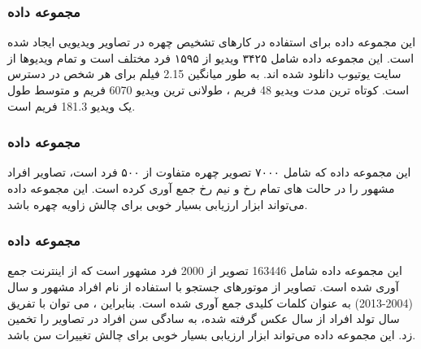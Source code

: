 \subsubsection{مجموعه داده }
این مجموعه داده برای استفاده در کارهای تشخیص چهره در تصاویر ویدیویی ایجاد شده است. این مجموعه داده شامل ۳۴۲۵ ویدیو از ۱۵۹۵ فرد مختلف است و تمام ویدیوها از سایت یوتیوب دانلود شده اند. به طور میانگین 2.15 فیلم برای هر شخص در دسترس است. کوتاه ترین مدت ویدیو 48 فریم ، طولانی ترین ویدیو 6070 فریم و متوسط طول یک ویدیو 181.3 فریم است. \cite{VGGFace2_dataset}

\subsubsection{مجموعه داده }
این مجموعه داده که شامل ۷۰۰۰ تصویر چهره متفاوت از ۵۰۰ فرد است، تصاویر افراد مشهور را در حالت های تمام رخ و نیم رخ جمع آوری کرده است. این مجموعه داده می‌تواند ابزار ارزیابی بسیار خوبی برای چالش زاویه چهره باشد. \cite{LFW_dataset}

\subsubsection{مجموعه داده }
این مجموعه داده شامل 163446 تصویر از 2000 فرد مشهور است که از اینترنت جمع آوری شده است. تصاویر از موتورهای جستجو با استفاده از نام افراد مشهور و سال (2004-2013) به عنوان کلمات کلیدی جمع آوری شده است. بنابراین ، می توان با تفریق سال تولد افراد از سال عکس گرفته شده، به سادگی سن افراد در تصاویر را تخمین زد.  این مجموعه داده می‌تواند ابزار ارزیابی بسیار خوبی برای چالش تغییرات سن باشد. \cite{CACD_dataset}

